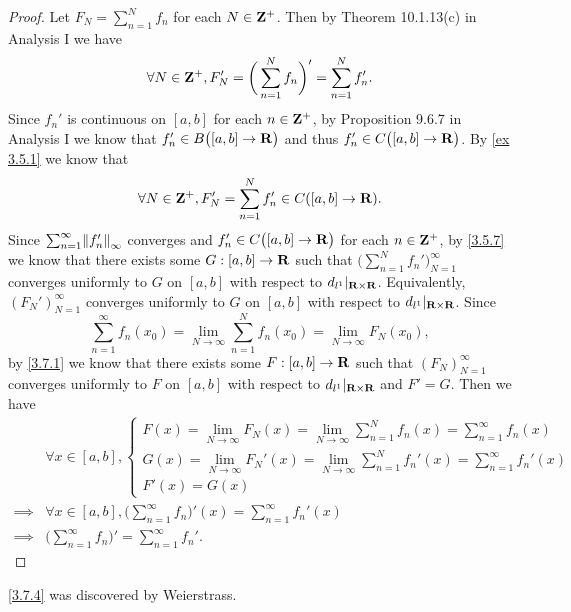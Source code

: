 \begin{proof}
  Let \(F_N = \sum_{n = 1}^N f_n\) for each \(N \in \mathbf{Z}^+\).
  Then by Theorem 10.1.13(c) in Analysis I we have
  \[
    \forall N \in \mathbf{Z}^+, F_N' = \bigg(\sum_{n = 1}^N f_n\bigg)' = \sum_{n = 1}^N f_n'.
  \]
  Since \(f_n'\) is continuous on \([a, b]\) for each \(n \in \mathbf{Z}^+\), by Proposition 9.6.7 in Analysis I we know that \(f_n' \in B\big([a, b] \to \mathbf{R}\big)\) and thus \(f_n' \in C\big([a, b] \to \mathbf{R}\big)\).
  By \cref{ex 3.5.1} we know that
  \[
    \forall N \in \mathbf{Z}^+, F_N' = \sum_{n = 1}^N f_n' \in C([a, b] \to \mathbf{R}).
  \]
  Since \(\sum_{n = 1}^\infty \norm*{f_n'}_\infty\) converges and \(f_n' \in C\big([a, b] \to \mathbf{R}\big)\) for each \(n \in \mathbf{Z}^+\), by \cref{3.5.7} we know that there exists some \(G : [a, b] \to \mathbf{R}\) such that \(\big(\sum_{n = 1}^N f_n'\big)_{N = 1}^\infty\) converges uniformly to \(G\) on \([a, b]\) with respect to \(d_{l^1}|_{\mathbf{R} \times \mathbf{R}}\).
  Equivalently, \((F_N')_{N = 1}^\infty\) converges uniformly to \(G\) on \([a, b]\) with respect to \(d_{l^1}|_{\mathbf{R} \times \mathbf{R}}\).
  Since
  \[
    \sum_{n = 1}^\infty f_n(x_0) = \lim_{N \to \infty} \sum_{n = 1}^N f_n(x_0) = \lim_{N \to \infty} F_N(x_0),
  \]
  by \cref{3.7.1} we know that there exists some \(F : [a, b] \to \mathbf{R}\) such that \((F_N)_{N = 1}^\infty\) converges uniformly to \(F\) on \([a, b]\) with respect to \(d_{l^1}|_{\mathbf{R} \times \mathbf{R}}\) and \(F' = G\).
  Then we have
  \begin{align*}
             & \forall x \in [a, b], \begin{cases}
                                       F(x) = \lim_{N \to \infty} F_N(x) = \lim_{N \to \infty} \sum_{n = 1}^N f_n(x) = \sum_{n = 1}^\infty f_n(x)    \\
                                       G(x) = \lim_{N \to \infty} F_N'(x) = \lim_{N \to \infty} \sum_{n = 1}^N f_n'(x) = \sum_{n = 1}^\infty f_n'(x) \\
                                       F'(x) = G(x)
                                     \end{cases} \\
    \implies & \forall x \in [a, b], \bigg(\sum_{n = 1}^\infty f_n\bigg)'(x) = \sum_{n = 1}^\infty f_n'(x)                                         \\
    \implies & \bigg(\sum_{n = 1}^\infty f_n\bigg)' = \sum_{n = 1}^\infty f_n'.
  \end{align*}
\end{proof}

\begin{note}
  \cref{3.7.4} was discovered by Weierstrass.
\end{note}

